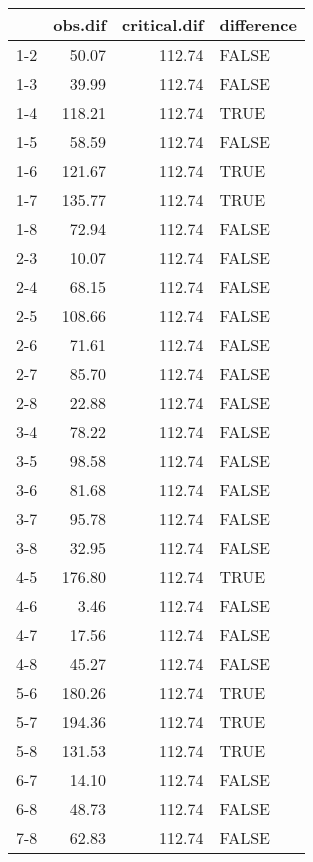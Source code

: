 \begin{table}[ht]
\centering
\begin{tabular}{rrrl}
  \hline
 & obs.dif & critical.dif & difference \\ 
  \hline
1-2 & 50.07 & 112.74 & FALSE \\ 
  1-3 & 39.99 & 112.74 & FALSE \\ 
  1-4 & 118.21 & 112.74 & TRUE \\ 
  1-5 & 58.59 & 112.74 & FALSE \\ 
  1-6 & 121.67 & 112.74 & TRUE \\ 
  1-7 & 135.77 & 112.74 & TRUE \\ 
  1-8 & 72.94 & 112.74 & FALSE \\ 
  2-3 & 10.07 & 112.74 & FALSE \\ 
  2-4 & 68.15 & 112.74 & FALSE \\ 
  2-5 & 108.66 & 112.74 & FALSE \\ 
  2-6 & 71.61 & 112.74 & FALSE \\ 
  2-7 & 85.70 & 112.74 & FALSE \\ 
  2-8 & 22.88 & 112.74 & FALSE \\ 
  3-4 & 78.22 & 112.74 & FALSE \\ 
  3-5 & 98.58 & 112.74 & FALSE \\ 
  3-6 & 81.68 & 112.74 & FALSE \\ 
  3-7 & 95.78 & 112.74 & FALSE \\ 
  3-8 & 32.95 & 112.74 & FALSE \\ 
  4-5 & 176.80 & 112.74 & TRUE \\ 
  4-6 & 3.46 & 112.74 & FALSE \\ 
  4-7 & 17.56 & 112.74 & FALSE \\ 
  4-8 & 45.27 & 112.74 & FALSE \\ 
  5-6 & 180.26 & 112.74 & TRUE \\ 
  5-7 & 194.36 & 112.74 & TRUE \\ 
  5-8 & 131.53 & 112.74 & TRUE \\ 
  6-7 & 14.10 & 112.74 & FALSE \\ 
  6-8 & 48.73 & 112.74 & FALSE \\ 
  7-8 & 62.83 & 112.74 & FALSE \\ 
   \hline
\end{tabular}
\end{table}
